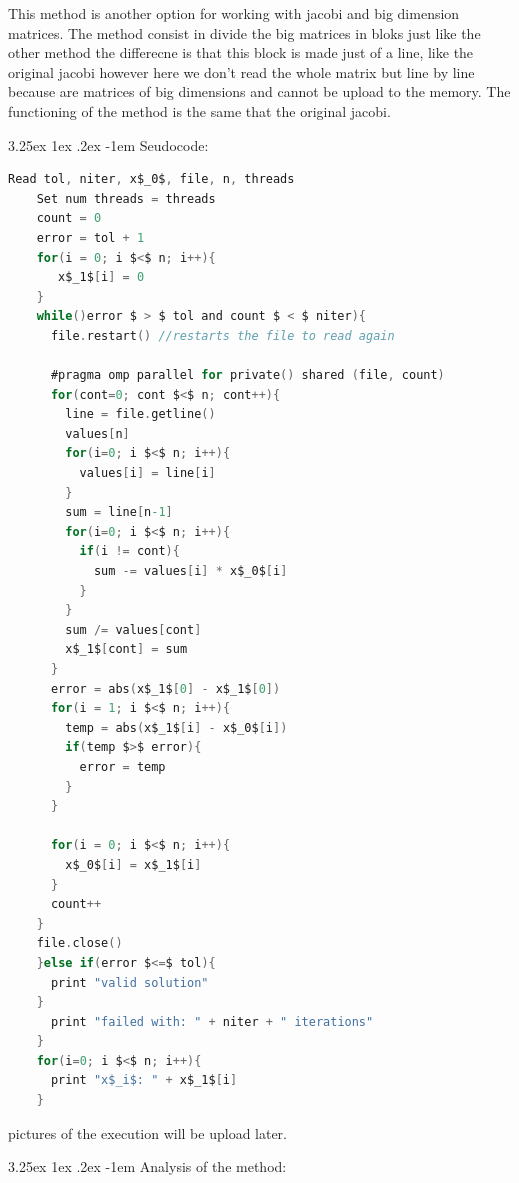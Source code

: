 \documentclass{article}
\makeatletter
\renewcommand\paragraph{\@startsection{paragraph}{5}{\z@}%
  {3.25ex \@plus1ex \@minus.2ex}%
  {-1em}%
  {\normalfont\normalsize\bfseries}}
\makeatother
\begin{document}
\hfill \break
This method is another option for working with jacobi and big dimension matrices. The method consist in divide the big matrices in bloks just like the other method the differecne is that this block is made just of a line, like the original jacobi however here we don't read the whole matrix but line by line because are matrices of big dimensions and cannot be upload to the memory. The functioning of the method is the same that the original jacobi.


\paragraph{Seudocode:}

\begin{program}
\end{program}

\begin{lstlisting}[language=C]
    Read tol, niter, x$_0$, file, n, threads
    Set num threads = threads
    count = 0
    error = tol + 1 
    for(i = 0; i $<$ n; i++){
       x$_1$[i] = 0
    }
    while()error $ > $ tol and count $ < $ niter){
      file.restart() //restarts the file to read again

      #pragma omp parallel for private() shared (file, count) 
      for(cont=0; cont $<$ n; cont++){
        line = file.getline()
        values[n]
        for(i=0; i $<$ n; i++){
          values[i] = line[i]
        }
        sum = line[n-1]
        for(i=0; i $<$ n; i++){
          if(i != cont){
            sum -= values[i] * x$_0$[i]
          }
        }
        sum /= values[cont]
        x$_1$[cont] = sum
      }
      error = abs(x$_1$[0] - x$_1$[0])
      for(i = 1; i $<$ n; i++){
        temp = abs(x$_1$[i] - x$_0$[i])
        if(temp $>$ error){
          error = temp
        }
      }
      
      for(i = 0; i $<$ n; i++){
        x$_0$[i] = x$_1$[i]
      }
      count++
    }
    file.close()
    }else if(error $<=$ tol){
      print "valid solution"
    }
      print "failed with: " + niter + " iterations"
    }
    for(i=0; i $<$ n; i++){
      print "x$_i$: " + x$_1$[i]
    }
\end{lstlisting}

pictures of the execution will be upload later.

\paragraph{Analysis of the method:}
\end{document}
